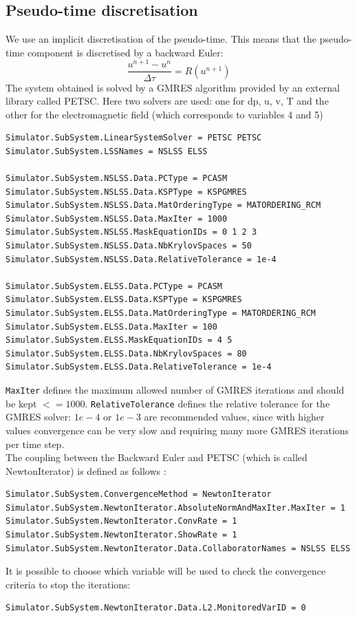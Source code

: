 \documentclass[11pt]{article}
\begin{document}
\subsection{Pseudo-time discretisation}
We use an implicit discretisation of the pseudo-time. This means
that the pseudo-time component is discretised by a backward Euler:
$$\frac{u^{n+1}-u^n}{\Delta \tau} = R(u^{n+1})$$
The system obtained is solved by a GMRES algorithm provided by 
an external library called PETSC. Here two solvers are used: one for dp, u, v, T
and the other for the electromagnetic field (which corresponds to variables 4 and 5)
\begin{verbatim} 
Simulator.SubSystem.LinearSystemSolver = PETSC PETSC
Simulator.SubSystem.LSSNames = NSLSS ELSS

Simulator.SubSystem.NSLSS.Data.PCType = PCASM
Simulator.SubSystem.NSLSS.Data.KSPType = KSPGMRES
Simulator.SubSystem.NSLSS.Data.MatOrderingType = MATORDERING_RCM
Simulator.SubSystem.NSLSS.Data.MaxIter = 1000
Simulator.SubSystem.NSLSS.MaskEquationIDs = 0 1 2 3
Simulator.SubSystem.NSLSS.Data.NbKrylovSpaces = 50
Simulator.SubSystem.NSLSS.Data.RelativeTolerance = 1e-4

Simulator.SubSystem.ELSS.Data.PCType = PCASM
Simulator.SubSystem.ELSS.Data.KSPType = KSPGMRES
Simulator.SubSystem.ELSS.Data.MatOrderingType = MATORDERING_RCM
Simulator.SubSystem.ELSS.Data.MaxIter = 100
Simulator.SubSystem.ELSS.MaskEquationIDs = 4 5
Simulator.SubSystem.ELSS.Data.NbKrylovSpaces = 80
Simulator.SubSystem.ELSS.Data.RelativeTolerance = 1e-4
\end{verbatim}

{\tt MaxIter} defines the maximum allowed number of GMRES iterations and 
should be kept $<= 1000$. {\tt RelativeTolerance} defines the relative tolerance for the GMRES solver: $1e-4$ or $1e-3$ are recommended values, since with higher values 
convergence can be very slow and requiring many more GMRES iterations per time step. \\
The coupling between the Backward Euler and PETSC (which is called NewtonIterator) is defined as follows :
\begin{verbatim}
Simulator.SubSystem.ConvergenceMethod = NewtonIterator
Simulator.SubSystem.NewtonIterator.AbsoluteNormAndMaxIter.MaxIter = 1
Simulator.SubSystem.NewtonIterator.ConvRate = 1
Simulator.SubSystem.NewtonIterator.ShowRate = 1
Simulator.SubSystem.NewtonIterator.Data.CollaboratorNames = NSLSS ELSS
\end{verbatim}
It is possible to choose which variable will be used to check the convergence criteria
to stop the iterations:
\begin{verbatim}
Simulator.SubSystem.NewtonIterator.Data.L2.MonitoredVarID = 0
\end{verbatim}
\end{document}
